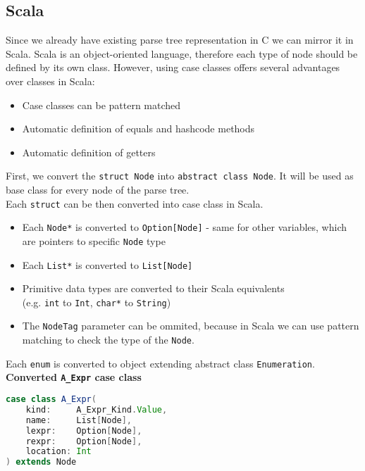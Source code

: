 \subsection{Scala}
Since we already have existing parse tree representation in C we can mirror it in Scala.
Scala is an object-oriented language, therefore each type of node should be defined by its own class. However, using case classes offers several advantages over classes in Scala: 
\begin{itemize}
    \item Case classes can be pattern matched
    \item Automatic definition of equals and hashcode methods
    \item Automatic definition of getters
\end{itemize}
First, we convert the \texttt{struct Node} into \texttt{abstract class Node}. It will be used as base class for every node of the parse tree. \\
Each \texttt{struct} can be then converted into case class in Scala. 
\begin{itemize}
    \item Each \texttt{Node*} is converted to \texttt{Option[Node]} - same for other variables, which are pointers to specific \texttt{Node} type
    \item Each \texttt{List*} is converted to \texttt{List[Node]}
    \item Primitive data types are converted to their Scala equivalents \\
    (e.g. \texttt{int} to \texttt{Int}, \texttt{char*} to \texttt{String})
    \item The \texttt{NodeTag} parameter can be ommited, because in Scala we can use pattern matching to check the type of the \texttt{Node}.
\end{itemize}
Each \texttt{enum} is converted to object extending abstract class \texttt{Enumeration}.
 \\
\textbf{Converted \texttt{A\_Expr} case class}
\begin{lstlisting}[language=scala, basicstyle=\ttfamily, caption={\texttt{A\_Expr} representation in Scala}]
case class A_Expr(
    kind:     A_Expr_Kind.Value,
    name:     List[Node],
    lexpr:    Option[Node],
    rexpr:    Option[Node],
    location: Int
) extends Node
\end{lstlisting}